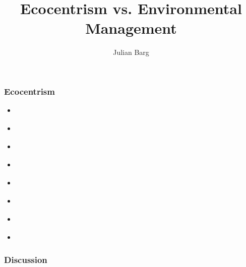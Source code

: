 \documentclass{article}
\title{Ecocentrism vs. Environmental Management}
\author{Julian Barg}
\begin{document}
	\maketitle




	

	

	

	\subsubsection*{Ecocentrism}

	\begin{itemize}
		\item \citet{Purser1995}
		\item \citet{Shrivastava1995}
		\item \citet{Banerjee2003}
		\item \citet{Springett2003}
		\item \citet{Milne2006}
		\item \citet{Banerjee2011}
		\item \citet{Hoffman2015}
		\item \citet{Ergene2020}
	\end{itemize}


	\subsubsection*{Discussion}
\end{document}

